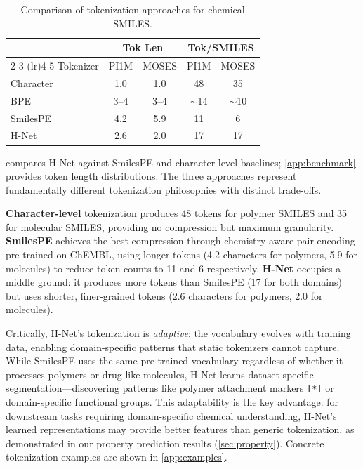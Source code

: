 \documentclass{article}
\newcommand{\hnet}{H-Net}
\newcommand{\smilespe}{SmilesPE}
\begin{document}
\begin{table}[t]
\caption{Comparison of tokenization approaches for chemical SMILES.}
\label{tab:benchmark}
\vskip 0.1in
\begin{center}
\begin{small}
\begin{tabular}{lcccc}
\toprule
 & \multicolumn{2}{c}{Tok Len} & \multicolumn{2}{c}{Tok/SMILES} \\
\cmidrule(lr){2-3} \cmidrule(lr){4-5}
Tokenizer & PI1M & MOSES & PI1M & MOSES \\
\midrule
Character & 1.0 & 1.0 & 48 & 35 \\
BPE & 3--4 & 3--4 & $\sim$14 & $\sim$10 \\
\smilespe{} & 4.2 & 5.9 & 11 & 6 \\
\hnet{} & 2.6 & 2.0 & 17 & 17 \\
\bottomrule
\end{tabular}
\end{small}
\end{center}
\vskip -0.1in
\end{table}

 compares \hnet{} against \smilespe{} and character-level baselines; \cref{app:benchmark} provides token length distributions. The three approaches represent fundamentally different tokenization philosophies with distinct trade-offs.

\textbf{Character-level} tokenization produces 48 tokens for polymer SMILES and 35 for molecular SMILES, providing no compression but maximum granularity. \textbf{\smilespe{}} achieves the best compression through chemistry-aware pair encoding pre-trained on ChEMBL, using longer tokens (4.2 characters for polymers, 5.9 for molecules) to reduce token counts to 11 and 6 respectively. \textbf{\hnet{}} occupies a middle ground: it produces more tokens than \smilespe{} (17 for both domains) but uses shorter, finer-grained tokens (2.6 characters for polymers, 2.0 for molecules).

Critically, \hnet{}'s tokenization is \emph{adaptive}: the vocabulary evolves with training data, enabling domain-specific patterns that static tokenizers cannot capture. While \smilespe{} uses the same pre-trained vocabulary regardless of whether it processes polymers or drug-like molecules, \hnet{} learns dataset-specific segmentation---discovering patterns like polymer attachment markers \texttt{[*]} or domain-specific functional groups. This adaptability is the key advantage: for downstream tasks requiring domain-specific chemical understanding, \hnet{}'s learned representations may provide better features than generic tokenization, as demonstrated in our property prediction results (\cref{sec:property}). Concrete tokenization examples are shown in \cref{app:examples}.
\end{document}
